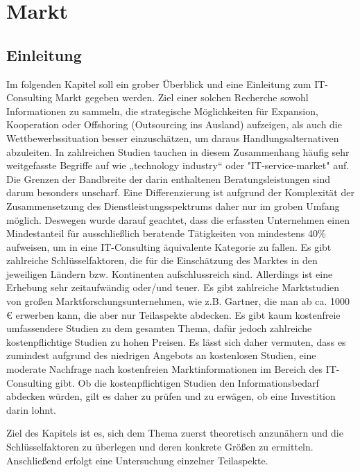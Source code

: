\section{Markt}
\subsection{Einleitung}
Im folgenden Kapitel soll ein grober Überblick und eine Einleitung zum IT-Consulting Markt gegeben werden. 
Ziel einer solchen Recherche sowohl Informationen zu sammeln, die strategische Möglichkeiten für Expansion, Kooperation oder Offshoring (Outsourcing ins Ausland)  aufzeigen, 
als auch die Wettbewerbssituation besser einzuschätzen, um daraus Handlungsalternativen abzuleiten. 
In zahlreichen Studien tauchen in diesem Zusammenhang häufig sehr weitgefasste Begriffe auf wie „technology industry“ oder "IT-service-market" auf. 
Die Grenzen der Bandbreite der darin enthaltenen Beratungsleistungen sind darum besonders unscharf. Eine Differenzierung ist aufgrund der Komplexität der Zusammensetzung des Dienstleistungsspektrums daher nur im groben Umfang möglich.
Deswegen wurde darauf geachtet, dass die erfassten Unternehmen einen Mindestanteil  für ausschließlich beratende Tätigkeiten von mindestens 40\%  aufweisen, um in eine IT-Consulting äquivalente Kategorie zu fallen.
Es gibt zahlreiche Schlüsselfaktoren, die für die Einschätzung des Marktes in den jeweiligen Ländern bzw. Kontinenten aufschlussreich sind. 
Allerdings ist eine Erhebung sehr zeitaufwändig oder/und teuer. Es gibt zahlreiche Marktstudien von großen Marktforschungsunternehmen, wie z.B. Gartner, die man ab ca. 1000 €  erwerben kann, die aber nur Teilaspekte abdecken. 
Es gibt kaum kostenfreie umfassendere Studien zu dem gesamten Thema, dafür jedoch zahlreiche kostenpflichtige Studien zu hohen Preisen. Es lässt sich daher vermuten, dass es zumindest aufgrund des niedrigen Angebots an kostenlosen Studien, eine moderate Nachfrage nach kostenfreien Marktinformationen im Bereich des IT-Consulting gibt. Ob die kostenpflichtigen Studien den Informationsbedarf abdecken würden, gilt es daher zu prüfen und zu erwägen, ob eine Investition darin lohnt.

 Ziel des Kapitels ist es, sich dem  Thema zuerst theoretisch anzunähern und die Schlüsselfaktoren zu überlegen und deren konkrete Größen zu ermitteln. Anschließend erfolgt eine Untersuchung einzelner Teilaspekte.

